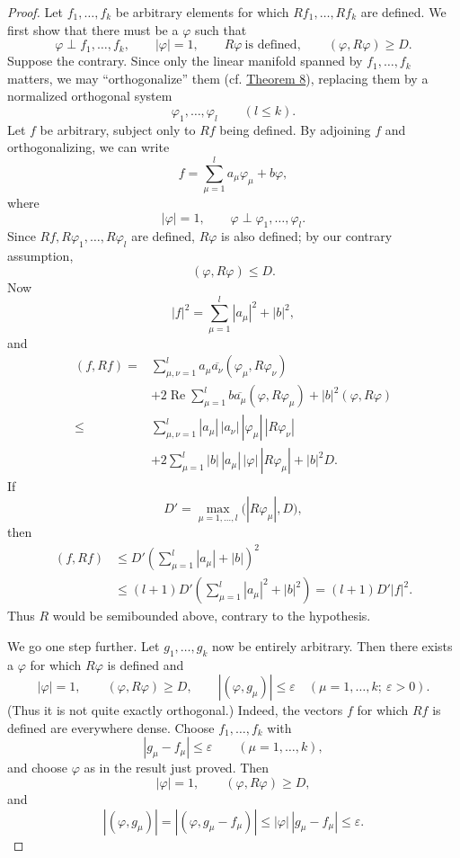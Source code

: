 ﻿\documentclass[paper=b5,fontsize=13pt,bookmarkpackage=false,twoside]{scrartcl}
\begin{document}
\begin{proof}
Let $f_1,\ldots,f_k$ be arbitrary elements for which $Rf_1,\ldots,Rf_k$ are defined. We first show that there must be a $\varphi$ such that
\[
\varphi\perp f_1,\ldots,f_k,\qquad
|\varphi|=1,\qquad
R\varphi\ \text{is defined},\qquad
(\varphi,R\varphi)\ge D.
\]
Suppose the contrary. Since only the linear manifold spanned by $f_1,\ldots,f_k$ matters, we may ``orthogonalize'' them (cf. \hyperref[thm:8]{Theorem 8}), replacing them by a normalized orthogonal system
\[
\varphi_1,\ldots,\varphi_l\qquad(l\le k).
\]
Let $f$ be arbitrary, subject only to $Rf$ being defined. By adjoining $f$ and orthogonalizing, we can write
\[
f=\sum_{\mu=1}^{l}a_\mu\varphi_\mu+b\varphi,
\]
where
\[
|\varphi|=1,\qquad
\varphi\perp\varphi_1,\ldots,\varphi_l.
\]
Since $Rf,R\varphi_1,\ldots,R\varphi_l$ are defined, $R\varphi$ is also defined; by our contrary assumption,
\[
(\varphi,R\varphi)\le D.
\]
Now
\[
|f|^2=\sum_{\mu=1}^{l}|a_\mu|^2+|b|^2,
\]
and
\begin{align*}
(f,Rf)
={}&\sum_{\mu,\nu=1}^{l}
a_\mu\overline{a_\nu}(\varphi_\mu,R\varphi_\nu)\\
&+2\operatorname{Re}\sum_{\mu=1}^{l}
b\overline{a_\mu}(\varphi,R\varphi_\mu)
 +|b|^2(\varphi,R\varphi)\\
\le{}&
\sum_{\mu,\nu=1}^{l}
|a_\mu|\,|a_\nu|\,|\varphi_\mu|\,|R\varphi_\nu|\\
&+2\sum_{\mu=1}^{l}
|b|\,|a_\mu|\,|\varphi|\,|R\varphi_\mu|
+|b|^2D.
\end{align*}
If
\[
D'=\max_{\mu=1,\ldots,l}\bigl(|R\varphi_\mu|,D\bigr),
\]
then
\begin{align*}
(f,Rf)
&\le D'\left(\sum_{\mu=1}^{l}|a_\mu|+|b|\right)^2\\
&\le(l+1)D'
\left(\sum_{\mu=1}^{l}|a_\mu|^2+|b|^2\right)
=(l+1)D'|f|^2.
\end{align*}
Thus $R$ would be semibounded above, contrary to the hypothesis.

We go one step further. Let $g_1,\ldots,g_k$ now be entirely arbitrary. Then there exists a $\varphi$ for which $R\varphi$ is defined and
\[
|\varphi|=1,\qquad
(\varphi,R\varphi)\ge D,\qquad
|(\varphi,g_\mu)|\le\varepsilon
\quad(\mu=1,\ldots,k;\ \varepsilon>0).
\]
(Thus it is not quite exactly orthogonal.) Indeed, the vectors $f$ for which $Rf$ is defined are everywhere dense. Choose $f_1,\ldots,f_k$ with
\[
|g_\mu-f_\mu|\le\varepsilon
\qquad(\mu=1,\ldots,k),
\]
and choose $\varphi$ as in the result just proved. Then
\[
|\varphi|=1,\qquad
(\varphi,R\varphi)\ge D,
\]
and
\[
|(\varphi,g_\mu)|
=|(\varphi,g_\mu-f_\mu)|
\le|\varphi|\,|g_\mu-f_\mu|
\le\varepsilon.
\]


\end{proof}
\end{document}
